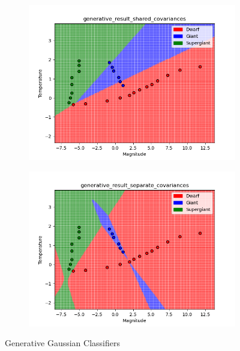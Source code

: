 \documentclass[submit]{harvardml}
\begin{document}
\begin{enumerate}
		\begin{figure}[h]
			\centering
			\begin{subfigure}[b]{0.475\textwidth}
				\includegraphics[width=\textwidth]{generative_result_shared_covariances}
			\end{subfigure}
			\hfill
			\begin{subfigure}[b]{0.475\textwidth}
				\includegraphics[width=\textwidth]{generative_result_separate_covariances}
			\end{subfigure}
			\caption{Generative Gaussian Classifiers}
			\label{fig:gaussian_classifiers}
		\end{figure}
		

\end{enumerate}
\end{document}
